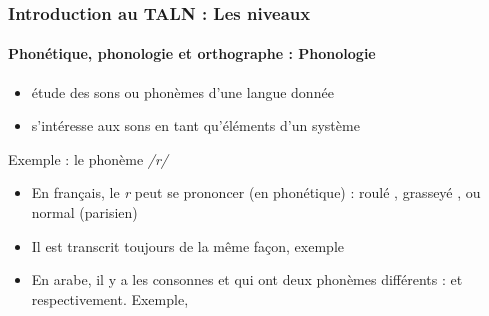 \documentclass{beamer}
\begin{document}
\begin{frame}
\frametitle{Introduction au TALN : Les niveaux}
\framesubtitle{Phonétique, phonologie et orthographe : Phonologie}

\begin{itemize}
	\item étude des sons ou phonèmes d'une langue donnée
	\item s'intéresse aux sons en tant qu'éléments d'un système
\end{itemize}

\begin{exampleblock}{Exemple : le phonème \textit{/r/}}
	\begin{itemize}
		\item En français, le \textit{r} peut se prononcer (en phonétique) : roulé \expword{\textipa{[r]}}, grasseyé \expword{\textipa{[\;R]}}, ou normal (parisien) \expword{\textipa{[K]}}
		\item Il est transcrit toujours de la même façon, exemple 
		\item En arabe, il y a les consonnes  et  qui ont deux phonèmes différents :  et  respectivement. 
		Exemple, 
	\end{itemize}
\end{exampleblock}

\end{frame}
\end{document}
